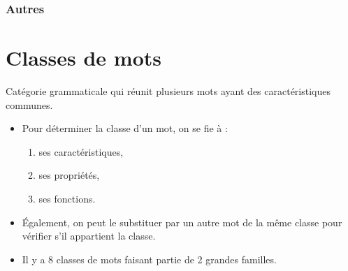 \documentclass[10pt, french]{article}
\begin{document}
\begin{multicols*}{2}
\begin{definitionNOHFILLprop}
\end{definitionNOHFILLprop}

\begin{definitionNOHFILLprop}

\end{definitionNOHFILLprop}

\begin{definitionNOHFILLprop}

\end{definitionNOHFILLprop}

\begin{definitionNOHFILLprop}[Le tiret]

\end{definitionNOHFILLprop}

\begin{definitionNOHFILLprop}

\end{definitionNOHFILLprop}

\subsubsection{Autres}

\begin{definitionNOHFILLprop}

\end{definitionNOHFILLprop}




\newpage
\section{Classes de mots}
\begin{definitionNOHFILL}
Catégorie grammaticale qui réunit plusieurs mots ayant des caractéristiques communes.
\begin{itemize}
	\item	Pour déterminer la classe d'un mot, on se fie à :
		\begin{enumerate}
		\item	ses caractéristiques,
		\item	ses propriétés,
		\item	ses fonctions.
		\end{enumerate}
	\item	Également, on peut le substituer par un autre mot de la même classe pour vérifier s'il appartient la classe.
	\item	Il y a 8 classes de mots faisant partie de 2 grandes familles.
\end{itemize}
\end{definitionNOHFILL}


\end{multicols*}
\end{document}
